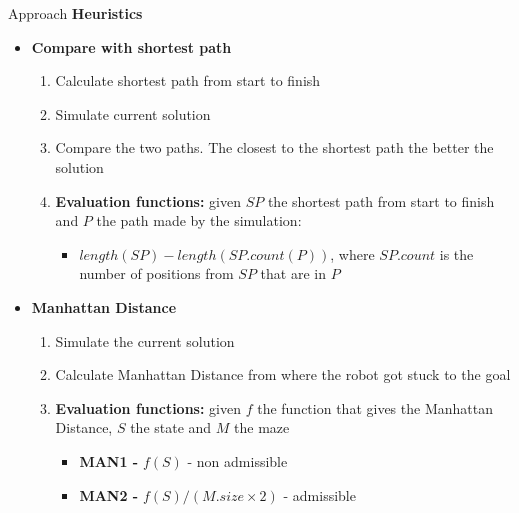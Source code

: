 


\begin{frame}{Approach}
    \textbf{Heuristics}
    \begin{itemize}
        \item \textbf{Compare with shortest path}
        \begin{enumerate}
            \item Calculate shortest path from start to finish
            \item Simulate current solution 
            \item Compare the two paths. The closest to the shortest path the better the solution
            \item \textbf{Evaluation functions:} given $SP$ the shortest path from start to finish and $P$ the path made by the simulation:
            \begin{itemize}
                \item $length(SP) - length(SP.count(P))$, where $SP.count$ is the number of positions from $SP$ that are in $P$
            \end{itemize}
        \end{enumerate}
        \item \textbf{Manhattan Distance}
        \begin{enumerate}
            \item Simulate the current solution
            \item Calculate Manhattan Distance from where the robot got stuck to the goal
            \item \textbf{Evaluation functions:} given $f$ the function that gives the Manhattan Distance, $S$ the state and $M$ the maze
            \begin{itemize}
                \item \textbf{MAN1 - } $f(S)$ - non admissible
                \item \textbf{MAN2 - } $f(S) / (M.size \times 2)$ - admissible
            \end{itemize}
        \end{enumerate}
    \end{itemize}
    
\end{frame}


